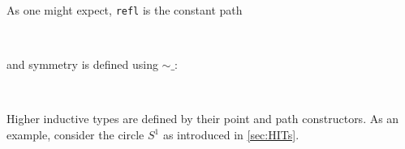 As one might expect, \texttt{refl} is the constant path
\begin{code}%
\>[0]\AgdaSpace{}%
\AgdaSymbol{:}\AgdaSpace{}%
\AgdaSymbol{\{}\AgdaSpace{}%
\AgdaSymbol{:}\AgdaSpace{}%
\AgdaSymbol{\}}\AgdaSpace{}%
\AgdaSpace{}%
\AgdaSpace{}%
\AgdaSpace{}%
\<%
\\
\>[0]\AgdaSpace{}%
\AgdaSymbol{\{}\AgdaSpace{}%
\AgdaSymbol{=}\AgdaSpace{}%
\AgdaSymbol{\}}\AgdaSpace{}%
\AgdaSymbol{=}\AgdaSpace{}%
\AgdaSpace{}%
\AgdaSpace{}%
\AgdaSpace{}%
\<%
\end{code}
and symmetry is defined using $\sim\_$:
\begin{code}%
\>[0]\AgdaSpace{}%
\AgdaSymbol{:}\AgdaSpace{}%
\AgdaSymbol{\{}\AgdaSpace{}%
\AgdaSpace{}%
\AgdaSymbol{:}\AgdaSpace{}%
\AgdaSymbol{\}}\AgdaSpace{}%
\AgdaSpace{}%
\AgdaSpace{}%
\AgdaSpace{}%
\AgdaSpace{}%
\AgdaSpace{}%
\AgdaSpace{}%
\AgdaSpace{}%
\<%
\\
\>[0]\AgdaSpace{}%
\AgdaSpace{}%
\AgdaSymbol{=}\AgdaSpace{}%
\AgdaSpace{}%
\AgdaSpace{}%
\AgdaSpace{}%
\AgdaSpace{}%
\AgdaSymbol{(}\AgdaOperator{\AgdaPrimitive{\textasciitilde{}}}\AgdaSpace{}%
\AgdaSymbol{)}\<%
\end{code}

Higher inductive types are defined by their point and path constructors. As an
example, consider the circle $S^1$ as introduced in \autoref{sec:HITs}.

\begin{code}%
\>[0]\AgdaSpace{}%
\AgdaSpace{}%
\AgdaSymbol{:}\AgdaSpace{}%
\AgdaSpace{}%
\<%
\\
\>[0][@{}l@{\AgdaIndent{0}}]%
\>[2]\AgdaSpace{}%
\AgdaSymbol{:}\AgdaSpace{}%
\<%
\\
%
\>[2]\AgdaSpace{}%
\AgdaSymbol{:}\AgdaSpace{}%
\AgdaSpace{}%
\AgdaSpace{}%
\<%
\end{code}

